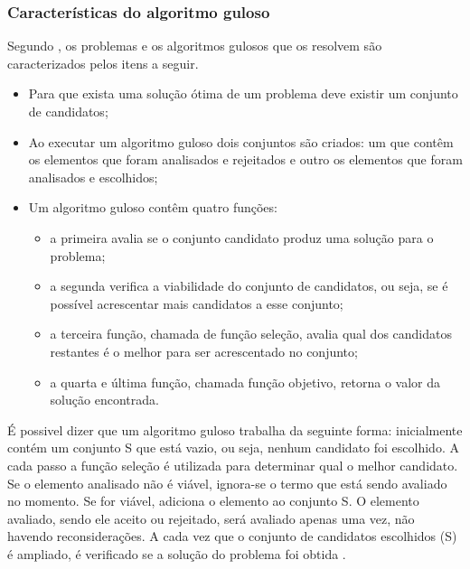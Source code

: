 \subsubsection{Características do algoritmo guloso}
Segundo \cite{anderson2004}, os problemas e os algoritmos gulosos que os resolvem são caracterizados pelos itens a seguir.
\begin{itemize}
\item Para que exista uma solução ótima de um problema deve existir um conjunto de candidatos;
\item Ao executar um algoritmo guloso dois conjuntos são criados: um que contêm os elementos que foram analisados e rejeitados e outro os elementos que foram analisados e escolhidos;
\item Um algoritmo guloso contêm quatro funções: 
\begin{itemize}
\item a primeira avalia se o conjunto candidato produz uma solução para o problema; 
\item a segunda verifica a viabilidade do conjunto de candidatos, ou seja, se é possível acrescentar mais candidatos a esse conjunto; 
\item a terceira função, chamada de função seleção, avalia qual dos candidatos restantes é o melhor para ser acrescentado no conjunto; 
\item a quarta e última função, chamada função objetivo, retorna o valor da solução encontrada.
\end{itemize} 
\end{itemize}
É possivel dizer que um algoritmo guloso trabalha da seguinte forma: inicialmente contém um conjunto S que está vazio, ou seja, nenhum candidato foi escolhido. A cada passo a função seleção é utilizada para determinar qual o melhor candidato. Se o elemento analisado não é viável, ignora-se o termo que está sendo avaliado no momento. Se for viável, adiciona o elemento ao conjunto S. O elemento avaliado, sendo ele aceito ou rejeitado, será avaliado apenas uma vez, não havendo reconsiderações. A cada vez que o conjunto de candidatos escolhidos (S) é ampliado, é verificado se a solução do problema foi obtida \cite{anderson2004}.  
